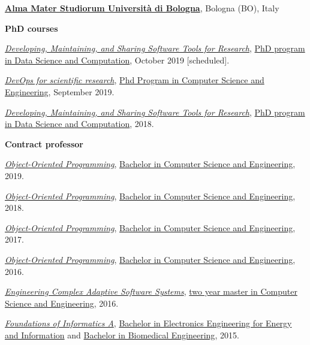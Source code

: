 \href{http://www.unibo.it}{\textbf{Alma Mater Studiorum Università di Bologna}}, Bologna (BO), Italy
\begin{outerlist}
\item[] \textbf{PhD courses} %
    \begin{innerlist}
      \item \href{https://bitbucket.org/danysk/courses-2018-developing-maintaining-and-sharing-software-tools/downloads/}{\textit{Developing, Maintaining, and Sharing Software Tools for Research}}, \href{http://archive.fo/Fmxxm}{PhD program in Data Science and Computation}, October 2019 [scheduled].
      \item \href{http://archive.fo/HKAC6/}{\textit{DevOps for scientific research}}, \href{http://archive.fo/ppTiB}{Phd Program in Computer Science and Engineering}, September 2019.
      \item \href{https://bitbucket.org/danysk/courses-2018-developing-maintaining-and-sharing-software-tools/downloads/}{\textit{Developing, Maintaining, and Sharing Software Tools for Research}}, \href{http://archive.fo/Fmxxm}{PhD program in Data Science and Computation}, 2018.
    \end{innerlist}
\item[] \textbf{Contract professor} %
    \begin{innerlist}
      \item \href{http://archive.fo/JtEDW}{\textit{Object-Oriented Programming}}, \href{http://archive.fo/UM5wl}{Bachelor in Computer Science and Engineering}, 2019.
      \item \href{http://archive.fo/srdtN}{\textit{Object-Oriented Programming}}, \href{http://archive.fo/UM5wl}{Bachelor in Computer Science and Engineering}, 2018.
      \item \href{http://archive.fo/54lT9}{\textit{Object-Oriented Programming}}, \href{http://archive.fo/UM5wl}{Bachelor in Computer Science and Engineering}, 2017.
      \item \href{http://archive.fo/0XLbd}{\textit{Object-Oriented Programming}}, \href{http://archive.fo/UM5wl}{Bachelor in Computer Science and Engineering}, 2016.
      \item \href{http://archive.fo/1eIMt}{\textit{Engineering Complex Adaptive Software Systems}}, \href{http://archive.fo/toz5c}{two year master in Computer Science and Engineering}, 2016.
      \item \href{http://archive.fo/JrWEu/}{\textit{Foundations of Informatics A}}, \href{http://archive.fo/30rN0}{Bachelor in Electronics Engineering for Energy and Information} and \href{http://archive.fo/jW52L}{Bachelor in Biomedical Engineering}, 2015.

\end{innerlist}
\end{outerlist}
